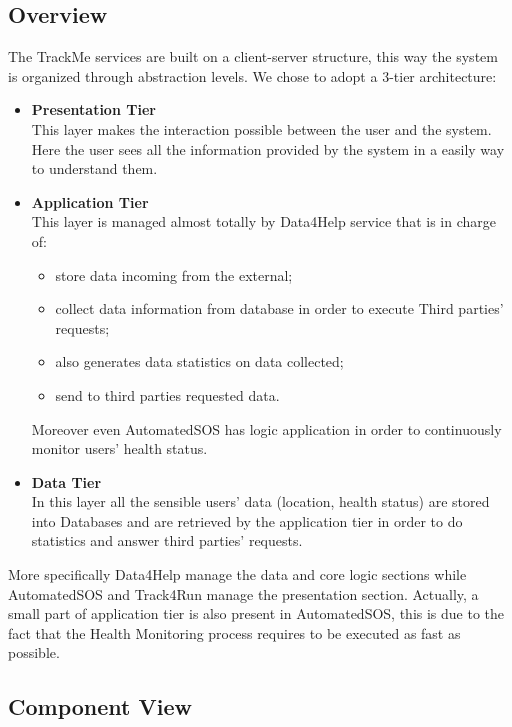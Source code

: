 \subsection{Overview}
The TrackMe services are built on a client-server structure, this way the system is organized through abstraction levels.
We chose to adopt a 3-tier architecture:
\begin{itemize}
	\item \textbf{Presentation Tier} \\This layer makes the interaction possible between the user and the system. Here the user sees all the information provided by the system in a easily way to understand them.
	\item \textbf{Application Tier} \\This layer is managed almost totally by Data4Help service that is in charge of:
	\begin{itemize}
		\item store data incoming from the external;
		\item collect data information from database in order to execute Third parties’ requests;
		\item also generates data statistics on data collected;
		\item send to third parties requested data.
	\end{itemize}
	Moreover even AutomatedSOS has logic application in order to continuously monitor users’ health status.
	\item \textbf{Data Tier} \\In this layer all the sensible users’ data (location, health status) are stored into Databases and are retrieved by the application tier in order to do statistics and answer third parties’ requests.
\end{itemize}

More specifically Data4Help manage the data and core logic sections while AutomatedSOS and Track4Run manage the presentation section. Actually, a small part of application tier is also present in AutomatedSOS, this is due to the fact that the Health Monitoring process requires to be executed as fast as possible.

\subsection{Component View}


